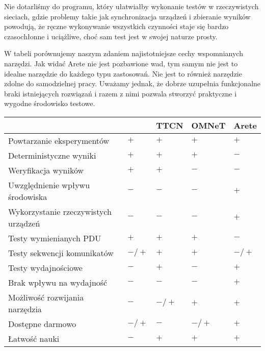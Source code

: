 \documentclass[00-praca-magisterska.tex]{subfiles}
\begin{document}
Nie dotarliśmy do programu, który ułatwiałby wykonanie testów w
rzeczywistych sieciach, gdzie problemy takie jak synchronizacja urządzeń i
zbieranie wyników powodują, że ręczne wykonywanie wszystkich czynności staje
się bardzo czasochłonne i uciążliwe, choć sam test jest w swojej naturze prosty.

W tabeli  porównujemy naszym zdaniem najistotniejsze cechy wspomnianych
narzędzi. Jak widać Arete nie jest pozbawione wad, tym samym nie jest to
idealne narzędzie do każdego typu zastosowań. Nie jest to również narzędzie
zdolne do samodzielnej pracy. Uważamy jednak, że dobrze uzupełnia funkcjonalne
braki istniejących rozwiązań i razem z nimi pozwala stworzyć praktyczne i
wygodne środowisko testowe.

\begin{small}
\begin{center}
   \begin{tabular}{ l || C{1.1cm} | C{1.1cm} | C{1.1cm} | C{1.1cm}   }
      \hline
      & \small{\parbox[top][2.4em][c]{1.1cm}{}} & \small{TTCN} & \small{OMNeT} & \small{Arete} \\
      \hline
      Powtarzanie eksperymentów & $+$ & $+$ & $+$ & $+$ \\
      \hline
      Deterministyczne wyniki & $+$ & $+$ & $+$ & $-$ \\
      \hline
      Weryfikacja wyników & $+$ & $+$ & $-$ & $-$ \\
      \hline
      Uwzględnienie wpływu środowiska & $-$ & $-$ & $-$ & $+$ \\
      \hline
      Wykorzystanie rzeczywistych urządzeń & $-$ & $-$ & $-$ & $+$ \\
      \hline
      Testy wymienianych PDU & $+$ & $+$ & $+$ & $-$ \\
      \hline
      Testy sekwencji komunikatów & $-/+$ & $+$ & $+$ & $-/+$ \\
      \hline
      Testy wydajnościowe & $-$ & $+$ & $-$ & $+$ \\
      \hline
      Brak wpływu na wydajność & $-$ & $-$ & $-$ & $+$ \\
      \hline
      Możliwość rozwijania narzędzia & $-$ & $-/+$ & $+$ & $+$ \\
      \hline
      Dostępne darmowo & $-/+$ & $-$ & $-/+$ & $+$ \\
      \hline
      Łatwość nauki & $-$ &  $+$ & $+$ & $+$ \\
      \hline

  \end{tabular}
\end{center}
\end{small}
\end{document}
